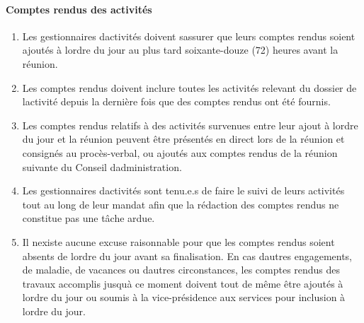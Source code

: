 \paragraph{Comptes rendus des activités}
\begin{enumerate}
 \item
  Les gestionnaires d\textquotesingle activités doivent s\textquotesingle assurer que leurs comptes rendus soient ajoutés à l\textquotesingle ordre du jour au plus tard soixante-douze (72) heures avant la réunion.
 \item
  Les comptes rendus doivent inclure toutes les activités relevant du dossier de l\textquotesingle activité depuis la dernière fois que des comptes rendus ont été fournis.
 \item
  Les comptes rendus relatifs à des activités survenues entre leur ajout à l\textquotesingle ordre du jour et la réunion peuvent être présentés en direct lors de la réunion et consignés au procès-verbal, ou ajoutés aux comptes rendus de la réunion suivante du Conseil d\textquotesingle administration.
 \item
  Les gestionnaires d\textquotesingle activités sont tenu.e.s de faire le suivi de leurs activités tout au long de leur mandat afin que la rédaction des comptes rendus ne constitue pas une tâche ardue.
 \item
  Il n\textquotesingle existe aucune excuse raisonnable pour que les comptes rendus soient absents de l\textquotesingle ordre du jour avant sa finalisation. En cas d\textquotesingle autres engagements, de maladie, de vacances ou d\textquotesingle autres circonstances, les comptes rendus des travaux accomplis jusqu\textquotesingle à ce moment doivent tout de même être ajoutés à l\textquotesingle ordre du jour ou soumis à la vice-présidence aux services pour inclusion à l\textquotesingle ordre du jour.
\end{enumerate}

